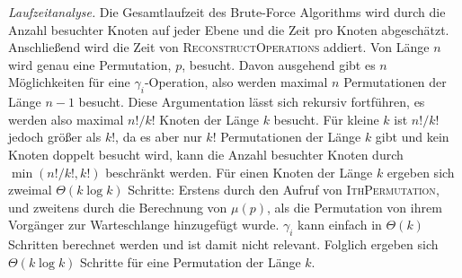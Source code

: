 \documentclass[a4paper, 11pt, ngerman]{article}
\begin{document}
\noindent \emph{Laufzeitanalyse.} Die Gesamtlaufzeit des Brute-Force Algorithms wird durch die Anzahl besuchter Knoten auf jeder Ebene und die Zeit pro Knoten abgeschätzt. Anschließend wird die Zeit von \textsc{ReconstructOperations} addiert. Von Länge $n$ wird genau eine Permutation, $p$, besucht. Davon ausgehend gibt es $n$ Möglichkeiten für eine $\gamma_i$-Operation, also werden maximal $n$ Permutationen der Länge $n - 1$ besucht. Diese Argumentation lässt sich rekursiv fortführen, es werden also maximal $n! / k!$ Knoten der Länge $k$ besucht. Für kleine $k$ ist $n! / k!$ jedoch größer als $k!$, da es aber nur $k!$ Permutationen der Länge $k$ gibt und kein Knoten doppelt besucht wird, kann die Anzahl besuchter Knoten durch $\min(n! / k!, k!)$ beschränkt werden. Für einen Knoten der Länge $k$ ergeben sich zweimal $\Theta(k \log k)$ Schritte: Erstens durch den Aufruf von \textsc{IthPermutation}, und zweitens durch die Berechnung von $\mu(p)$, als die Permutation von ihrem Vorgänger zur Warteschlange hinzugefügt wurde. $\gamma_i$ kann einfach in $\Theta(k)$ Schritten berechnet werden und ist damit nicht relevant. Folglich ergeben sich $\Theta(k \log k)$ Schritte für eine Permutation der Länge $k$.
\end{document}
